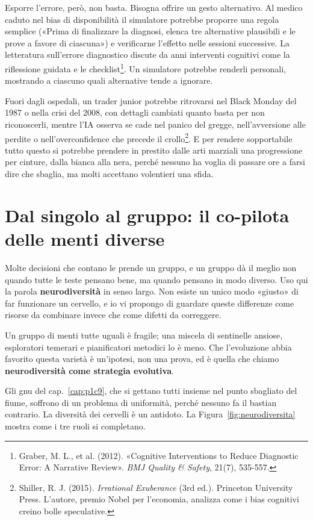 Esporre l'errore, però, non basta. Bisogna offrire un gesto alternativo. Al medico caduto nel bias di disponibilità il simulatore potrebbe proporre una regola semplice («Prima di finalizzare la diagnosi, elenca tre alternative plausibili e le prove a favore di ciascuna») e verificarne l'effetto nelle sessioni successive. La letteratura sull'errore diagnostico discute da anni interventi cognitivi come la riflessione guidata e le checklist\footnote{Graber, M. L., et al. (2012). «Cognitive Interventions to Reduce Diagnostic Error: A Narrative Review». \textit{BMJ Quality \& Safety}, 21(7), 535-557.}. Un simulatore potrebbe renderli personali, mostrando a ciascuno quali alternative tende a ignorare.

Fuori dagli ospedali, un trader junior potrebbe ritrovarsi nel Black Monday del 1987 o nella crisi del 2008, con dettagli cambiati quanto basta per non riconoscerli, mentre l'IA osserva se cade nel panico del gregge, nell'avversione alle perdite o nell'overconfidence che precede il crollo\footnote{Shiller, R. J. (2015). \textit{Irrational Exuberance} (3rd ed.). Princeton University Press. L'autore, premio Nobel per l'economia, analizza come i bias cognitivi creino bolle speculative.}. E per rendere sopportabile tutto questo si potrebbe prendere in prestito dalle arti marziali una progressione per cinture, dalla bianca alla nera, perché nessuno ha voglia di passare ore a farsi dire che sbaglia, ma molti accettano volentieri una sfida.

\section{Dal singolo al gruppo: il co-pilota delle menti diverse}
\label{sec:p4c33-dal-singolo-al-gruppo}
Molte decisioni che contano le prende un gruppo, e un gruppo dà il meglio non quando tutte le teste pensano bene, ma quando pensano in modo diverso. Uso qui la parola \textbf{neurodiversità} in senso largo. Non esiste un unico modo «giusto» di far funzionare un cervello, e io vi propongo di guardare queste differenze come risorse da combinare invece che come difetti da correggere.

Un gruppo di menti tutte uguali è fragile; una miscela di sentinelle ansiose, esploratori temerari e pianificatori metodici lo è meno. Che l'evoluzione abbia favorito questa varietà è un'ipotesi, non una prova, ed è quella che chiamo \textbf{neurodiversità come strategia evolutiva}.

Gli gnu del cap.~\ref{cap:p1c9}, che si gettano tutti insieme nel punto sbagliato del fiume, soffrono di un problema di uniformità, perché nessuno fa il bastian contrario. La diversità dei cervelli è un antidoto. La Figura~\ref{fig:neurodiversita} mostra come i tre ruoli si completano.

